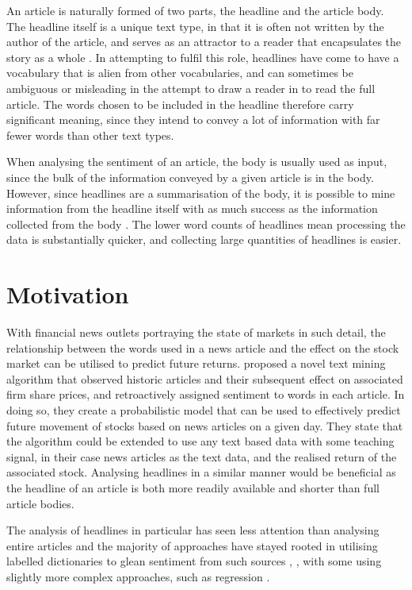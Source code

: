 An article is naturally formed of two parts, the headline and the article body. The headline itself is a unique text type, in that it is often not written by the author of the article, and serves as an attractor to a reader that encapsulates the story as a whole \parencite{language-newspapers}. In attempting to fulfil this role, headlines have come to have a vocabulary that is alien from other vocabularies, and can sometimes be ambiguous or misleading in the attempt to draw a reader in to read the full article. The words chosen to be included in the headline therefore carry significant meaning, since they intend to convey a lot of information with far fewer words than other text types.

When analysing the sentiment of an article, the body is usually used as input, since the bulk of the information conveyed by a given article is in the body. However, since headlines are a summarisation of the body, it is possible to mine information from the headline itself with as much success as the information collected from the body \parencite{kirange2016sentiment}. The lower word counts of headlines mean processing the data is substantially quicker, and collecting large quantities of headlines is easier.

\section{Motivation}
\label{sec:motivation}
With financial news outlets portraying the state of markets in such detail, the relationship between the words used in a news article and the effect on the stock market can be utilised to predict future returns. \textcite{sestm} proposed a novel text mining algorithm that observed historic articles and their subsequent effect on associated firm share prices, and retroactively assigned sentiment to words in each article. In doing so, they create a probabilistic model that can be used to effectively predict future movement of stocks based on news articles on a given day. They state that the algorithm could be extended to use any text based data with some teaching signal, in their case news articles as the text data, and the realised return of the associated stock. Analysing headlines in a similar manner would be beneficial as the headline of an article is both more readily available and shorter than full article bodies.

The analysis of headlines in particular has seen less attention than analysing entire articles and the majority of approaches have stayed rooted in utilising labelled dictionaries to glean sentiment from such sources \parencite{kirange2016sentiment}, \parencite{nemes-prediction}, with some using slightly more complex approaches, such as regression \parencite{john2017sentiment}.

